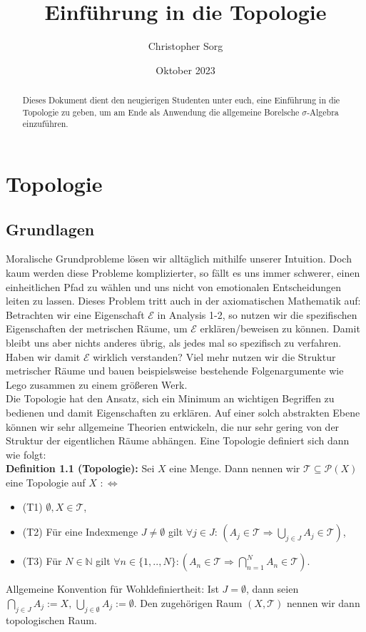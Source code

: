 \documentclass[11pt,english]{smfart}
\title{Einführung in die Topologie}
\date {Oktober 2023}
\author{Christopher Sorg}
\begin{document}
\def\smfbyname{}

\begin{abstract}
Dieses Dokument dient den neugierigen Studenten unter euch, eine Einführung in die Topologie zu geben, um am Ende als Anwendung die allgemeine Borelsche \(\sigma\)-Algebra einzuführen.
\end{abstract}
\maketitle

\tableofcontents

\section{Topologie}
\subsection{Grundlagen}
Moralische Grundprobleme lösen wir alltäglich mithilfe unserer Intuition. Doch kaum werden diese Probleme komplizierter, so fällt es uns immer schwerer, einen einheitlichen Pfad zu wählen und uns nicht von emotionalen Entscheidungen leiten zu lassen. Dieses Problem tritt auch in der axiomatischen Mathematik auf:\\
Betrachten wir eine Eigenschaft \(\mathcal{E}\) in Analysis 1-2, so nutzen wir die spezifischen Eigenschaften der metrischen Räume, um \(\mathcal{E}\) erklären/beweisen zu können. Damit bleibt uns aber nichts anderes übrig, als jedes mal so spezifisch zu verfahren. Haben wir damit \(\mathcal{E}\) wirklich verstanden? Viel mehr nutzen wir die Struktur metrischer Räume und bauen beispielsweise bestehende Folgenargumente wie Lego zusammen zu einem größeren Werk.\\
Die Topologie hat den Ansatz, sich ein Minimum an wichtigen Begriffen zu bedienen und damit Eigenschaften zu erklären. Auf einer solch abstrakten Ebene können wir sehr allgemeine Theorien entwickeln, die nur sehr gering von der Struktur der eigentlichen Räume abhängen. Eine Topologie definiert sich dann wie folgt:\\[0.5cm]
\textbf{Definition 1.1 (Topologie):} Sei \(X\) eine Menge. Dann nennen wir \(\mathcal{T} \subseteq \mathcal{P}(X)\) eine Topologie auf \(X\) \(: \Leftrightarrow\)
\begin{itemize}
    \item (T1) \(\emptyset, X \in \mathcal{T}\),
    \item (T2) Für eine Indexmenge \(J \neq \emptyset\) gilt \(\forall j \in J : \, (A_j \in \mathcal{T} \Rightarrow \bigcup_{j \in J} A_j \in \mathcal{T})\),
    \item (T3) Für \(N \in \mathbb{N}\) gilt \(\forall n \in \{1,..,N\}: (A_n \in \mathcal{T} \Rightarrow \bigcap_{n=1}^N A_n \in \mathcal{T})\).
\end{itemize}
Allgemeine Konvention für Wohldefiniertheit: Ist \(J = \emptyset\), dann seien \(\bigcap_{j \in J} A_j := X, \, \bigcup_{j \in \emptyset} A_j := \emptyset\). Den zugehörigen Raum \((X,\mathcal{T})\) nennen wir dann topologischen Raum.\\
\end{document}
